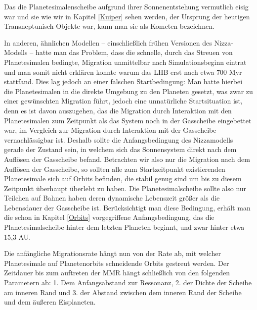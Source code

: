\documentclass[10pt,a4paper,twoside]{article}
\begin{document}
Das die Planetesimalenscheibe aufgrund ihrer Sonnenentstehung vermutlich eisig war und sie wie wir in Kapitel \ref{Kuiper} sehen werden, der Ursprung der heutigen Transneptunisch Objekte war, kann man sie als Kometen bezeichnen\cite{Gomes2005}. %

In anderen, ähnlichen Modellen – einschließlich frühen Versionen des Nizza-Modells – hatte man das Problem, dass die schnelle, durch das Streuen von Planetesimalen bedingte, Migration unmittelbar nach Simulationsbeginn eintrat und man somit nicht erklären konnte warum das LHB erst nach etwa 700 Myr stattfand.
Dies lag jedoch an einer falschen Startbedingung: Man hatte hierbei die Planetesimalen in die direkte Umgebung zu den Planeten gesetzt, was zwar zu einer gewünschten Migration führt, jedoch eine unnatürliche Startsituation ist,
denn es ist davon auszugehen, das die Migration durch Interaktion mit den Planetesimalen zum Zeitpunkt als das System noch in der Gasscheibe eingebettet war, im Vergleich zur Migration durch Interaktion mit der Gasscheibe vernachlässigbar ist.
Deshalb sollte die Anfangsbedingung des Nizzamodells gerade der Zustand sein, in welchem sich das Sonnensystem direkt nach dem Auflösen der Gasscheibe befand. Betrachten wir also nur die Migration nach dem Auflösen der Gasscheibe, so sollten alle zum Startzeitpunkt existierenden Planetesimale sich auf Orbits befinden, die stabil genug sind um bis zu diesem Zeitpunkt überhaupt überlebt zu haben. %
Die Planetesimalscheibe sollte also nur Teilchen auf Bahnen haben deren dynamische Lebenszeit größer als die Lebensdauer der Gasscheibe ist.\cite{Gomes2005} Berücksichtigt man diese Bedingung, erhält man die schon in Kapitel \ref{Orbits} vorgegriffene Anfangsbedingung, das die Planetesimalscheibe hinter dem letzten Planeten beginnt, und zwar hinter etwa 15,3 AU.\cite{Gomes2005}

Die anfängliche Migrationsrate hängt nun von der Rate ab, mit welcher Planetesimale auf Planetenorbits schneidende Orbits gestreut werden. Der Zeitdauer bis zum auftreten der MMR hängt schließlich von den folgenden Parametern ab:
1. Dem Anfangsabstand zur Ressonanz, 2. der Dichte der Scheibe am inneren Rand und 3. der Abstand zwischen dem inneren Rand der Scheibe und dem äußeren Eisplaneten.\cite{Gomes2005}
\end{document}
